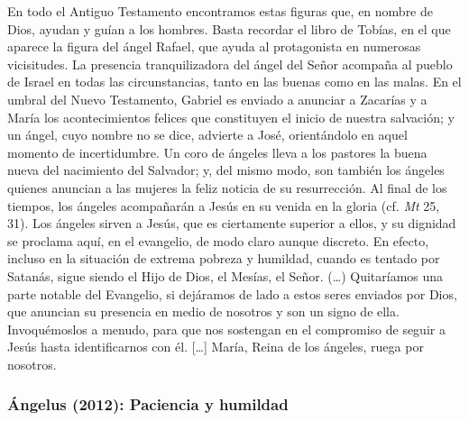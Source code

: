 \begin{body}
En todo el Antiguo Testamento encontramos estas figuras que, en nombre de Dios, ayudan y guían a los hombres. Basta recordar el libro de Tobías, en el que aparece la figura del ángel Rafael, que ayuda al protagonista en numerosas vicisitudes. La presencia tranquilizadora del ángel del Señor acompaña al pueblo de Israel en todas las circunstancias, tanto en las buenas como en las malas. En el umbral del Nuevo Testamento, Gabriel es enviado a anunciar a Zacarías y a María los acontecimientos felices que constituyen el inicio de nuestra salvación; y un ángel, cuyo nombre no se dice, advierte a José, orientándolo en aquel momento de incertidumbre. Un coro de ángeles lleva a los pastores la buena nueva del nacimiento del Salvador; y, del mismo modo, son también los ángeles quienes anuncian a las mujeres la feliz noticia de su resurrección. Al final de los tiempos, los ángeles acompañarán a Jesús en su venida en la gloria (cf. \textit{Mt} 25, 31). Los ángeles sirven a Jesús, que es ciertamente superior a ellos, y su dignidad se proclama aquí, en el evangelio, de modo claro aunque discreto. En efecto, incluso en la situación de extrema pobreza y humildad, cuando es tentado por Satanás, sigue siendo el Hijo de Dios, el Mesías, el Señor. (\ldots) Quitaríamos una parte notable del Evangelio, si dejáramos de lado a estos seres enviados por Dios, que anuncian su presencia en medio de nosotros y son un signo de ella. Invoquémoslos a menudo, para que nos sostengan en el compromiso de seguir a Jesús hasta identificarnos con él. [\ldots] María, Reina de los ángeles, ruega por nosotros.
\end{body}


\label{b2-03-012009A}
\newpage

\subsubsection{Ángelus (2012): Paciencia y humildad}


